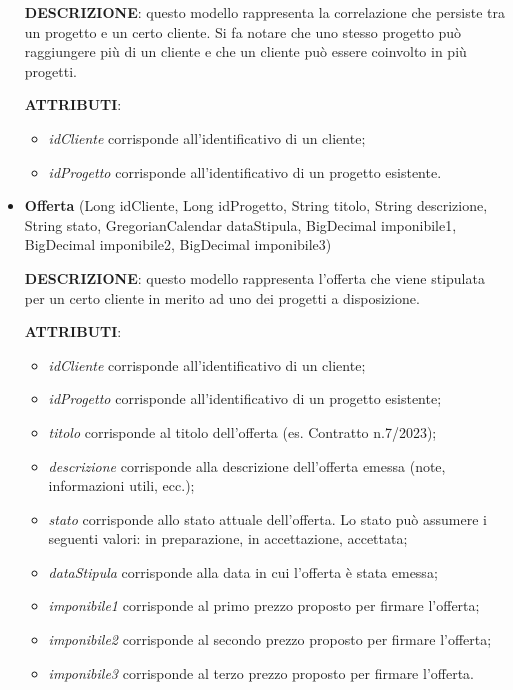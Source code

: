 \begin{itemize}
\setlength{\parskip}{3ex}

\textbf{DESCRIZIONE}: questo modello rappresenta la correlazione che persiste tra un progetto e un certo cliente. Si fa notare che uno stesso progetto può raggiungere più di un cliente e che un cliente può essere coinvolto in più progetti.

\setlength{\parskip}{3ex}

\textbf{ATTRIBUTI}:
\begin{itemize}
\item \textit{idCliente} corrisponde all'identificativo di un cliente;
\item \textit{idProgetto} corrisponde all'identificativo di un progetto esistente.
\end{itemize}

\pagebreak

\item \textbf{Offerta} (Long idCliente, Long idProgetto, String titolo, String descrizione, String stato, GregorianCalendar dataStipula, BigDecimal imponibile1, BigDecimal imponibile2, BigDecimal imponibile3)

\setlength{\parskip}{3ex}

\textbf{DESCRIZIONE}: questo modello rappresenta l'offerta che viene stipulata per un certo cliente in merito ad uno dei progetti a disposizione.

\setlength{\parskip}{3ex}

\textbf{ATTRIBUTI}:
\begin{itemize}
\item \textit{idCliente} corrisponde all'identificativo di un cliente;
\item \textit{idProgetto} corrisponde all'identificativo di un progetto esistente;
\item \textit{titolo} corrisponde al titolo dell'offerta (es. Contratto n.7/2023);
\item \textit{descrizione} corrisponde alla descrizione dell'offerta emessa (note, informazioni utili, ecc.);
\item \textit{stato} corrisponde allo stato attuale dell'offerta. Lo stato può assumere i seguenti valori: in preparazione, in accettazione, accettata;
\item \textit{dataStipula} corrisponde alla data in cui l'offerta è stata emessa;
\item \textit{imponibile1} corrisponde al primo prezzo proposto per firmare l'offerta;
\item \textit{imponibile2} corrisponde al secondo prezzo proposto per firmare l'offerta;
\item \textit{imponibile3} corrisponde al terzo prezzo proposto per firmare l'offerta.
\end{itemize}
\end{itemize}

